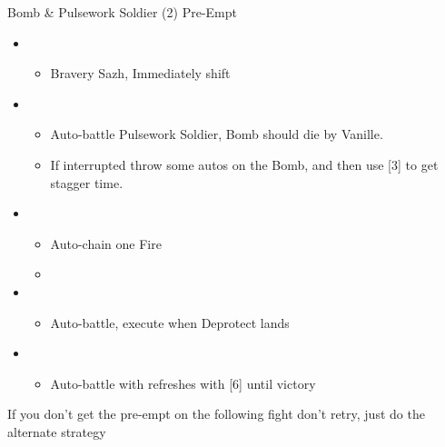 \begin{battle}{Bomb \& Pulsework Soldier (2) Pre-Empt}
\begin{itemize}
    \item \second
    \begin{itemize}
        \item Bravery Sazh, Immediately shift
    \end{itemize}
    \item \first
    \begin{itemize}
        \item Auto-battle Pulsework Soldier, Bomb should die by Vanille.
        \item If interrupted throw some autos on the Bomb, and then use [3] to get stagger time.
    \end{itemize}
    \item \fifth
    \begin{itemize}
        \item Auto-chain one Fire
        \item \stagger
    \end{itemize}
    \item \third
    \begin{itemize}
        \item Auto-battle, execute when Deprotect lands
    \end{itemize}
    \item \first
    \begin{itemize}
        \item Auto-battle with refreshes with [6] until victory
    \end{itemize}
\end{itemize}
\end{battle}

If you don't get the pre-empt on the following fight don't retry, just do the alternate strategy

